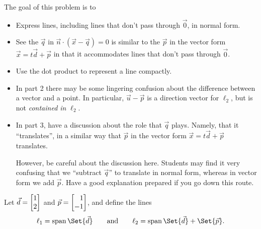 \documentclass{problemset}
\begin{document}
	\question
	\begin{annotation}
		\begin{goals}

			The goal of this problem is to
			\begin{itemize}
				\item Express lines, including lines that don't pass through $\vec 0$,
					in normal form.
				\item See the $\vec q$ in $\vec n\cdot (\vec x-\vec q)=0$ is similar
					to the $\vec p$ in the vector form $\vec x=t\vec d+\vec p$ in
					that it accommodates lines that don't pass through $\vec 0$.
				\item Use the dot product to represent a line compactly.
			\end{itemize}
		\end{goals}

		\begin{notes}
			\begin{itemize}
				\item In part 2 there may be some lingering confusion about the difference between
					a vector and a point. In particular, $\vec u-\vec p$ is a direction vector for $\ell_2$,
					but is not \emph{contained in} $\ell_2$.
				\item In part 3, have a discussion about the role that $\vec q$ plays. Namely,
					that it ``translates'', in a similar way that $\vec p$ in the vector
					form $\vec x=t\vec d+\vec p$ translates.

					However, be careful about the discussion here. Students may find it very
					confusing that we ``subtract $\vec q$'' to translate in normal form, whereas in
					vector form we add $\vec p$. Have a good explanation prepared if you go
					down this route.
			\end{itemize}
		\end{notes}
	\end{annotation}
	Let $\vec d=\mat{1\\2}$ and $\vec p=\mat{1\\-1}$, and define the lines
	\[
		\ell_1 = \Span\Set{\vec d}\qquad\text{and}\qquad \ell_2=\Span\Set{\vec d}+\Set{\vec p}.
	\]
\end{document}
